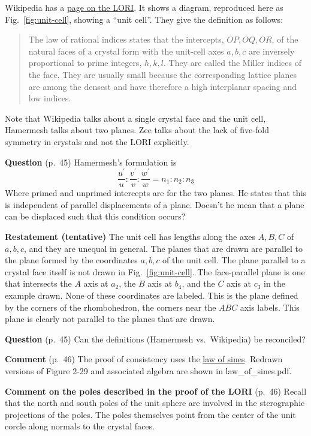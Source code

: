 Wikipedia has a
\href{https://en.wikipedia.org/wiki/Law_of_rational_indices}{page on
  the LORI}. It shows a diagram, reproduced here as
Fig.\ \ref{fig:unit-cell}, showing a ``unit cell''. They give the definition as follows:

\begin{quote}
The law of rational indices states that the intercepts, $OP, OQ, OR$, of
the natural faces of a crystal form with the unit-cell axes $a, b, c$
are inversely proportional to prime integers, $h, k, l$. They are called
the Miller indices of the face. They are usually small because the
corresponding lattice planes are among the densest and have therefore
a high interplanar spacing and low indices.
\end{quote}

Note that Wikipedia talks about a single crystal face and the unit
cell, Hamermesh talks about two planes. Zee talks about the lack of
five-fold symmetry in crystals and not the LORI explicitly.

{\bf Question} (p.\ 45) Hamermesh's formulation is
$$
\frac{u^\prime}{u}:\frac{v^\prime}{v}:\frac{w^\prime}{w} = n_1:n_2:n_3
$$
Where primed and unprimed intercepts are for the two planes.
He states that this is independent of parallel displacements of a
plane. Doesn't he mean that a plane can be displaced such that this
condition occurs?

{\bf Restatement (tentative)} The unit cell has lengths along the axes
$A, B, C$ of $a, b, c$, and they are unequal in general. The planes that
are drawn are parallel to the plane formed by the coordinates $a,b,c$
of the unit cell. The plane
parallel to a crystal face itself is not drawn in
Fig.\ \ref{fig:unit-cell}. The face-parallel plane is one that
intersects the $A$ axis at $a_2$, the $B$ axis at $b_4$, and the $C$ axis
at $c_3$ in the
example drawn. None of these coordinates are labeled. This is the plane
defined by the corners of the
rhombohedron, the corners near the $ABC$ axis labels. This plane is
clearly not parallel to the planes that
are drawn.

{\bf Question} (p.\ 45) Can the definitions (Hamermesh vs.\ Wikipedia)
be reconciled?

{\bf Comment} (p.\ 46) The proof of consistency uses the
\href{https://en.wikipedia.org/wiki/Law_of_sines}{law of
  sines}. Redrawn versions of Figure 2-29 and associated algebra are
shown in law\_of\_sines.pdf.

{\bf Comment on the poles described in the proof of the LORI} (p.\ 46)
Recall that the north and south poles of the unit sphere are involved
in the sterographic projections of the poles. The poles themselves
point from the center of the unit corcle along normals to the crystal
faces.

